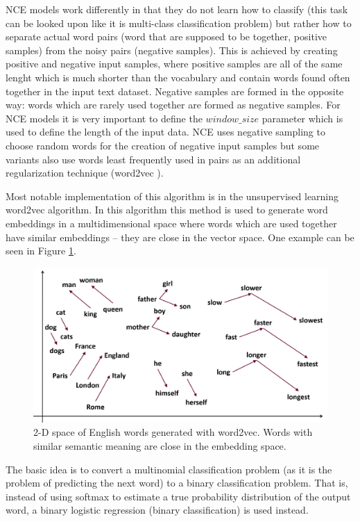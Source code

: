 \documentclass[b5paper]{book}
\let\cite\parencite
\begin{document}
NCE models work differently in that they do not learn how to classify (this task can be looked upon like it is multi-class classification problem) but rather how to separate actual word pairs (word that are supposed to be together, positive samples) from the noisy pairs (negative samples). This is achieved by creating positive and negative input samples, where positive samples are all of the same lenght which is much shorter than the vocabulary and contain words found often together in the input text dataset. Negative samples are formed in the opposite way: words which are rarely used together are formed as negative samples. For NCE models it is very important to define the \(window\_size\) parameter which is used to define the length of the input data. NCE uses negative sampling to choose random words for the creation of negative input samples but some variants also use words least frequently used in pairs as an additional regularization technique (word2vec \cite{mikolov2013efficient}).

Most notable implementation of this algorithm is in the unsupervised learning word2vec \cite{mikolov2013efficient} algorithm. In this algorithm this method is used to generate word embeddings in a multidimensional space where words which are used together have similar embeddings -- they are close in the vector space. One example can be seen in Figure \ref{fig:word2vec}.

\begin{figure}
    \centering
    \includegraphics[scale=0.2]{figures/word2vec.png}    \caption{2-D space of English words generated with word2vec. Words with similar semantic meaning are close in the embedding space.}
    \label{fig:word2vec}
\end{figure}

The basic idea is to convert a multinomial classification problem (as it is the problem of predicting the next word) to a binary classification problem. That is, instead of using softmax to estimate a true probability distribution of the output word, a binary logistic regression (binary classification) is used instead.
\end{document}
